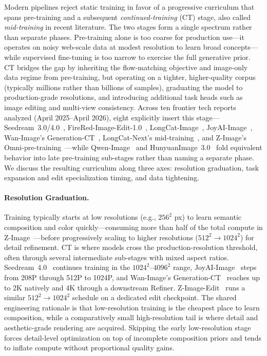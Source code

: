 {Modern pipelines reject static training in favor of a progressive curriculum that spans pre-training and a subsequent \emph{continued-training} (CT) stage, also called \emph{mid-training} in recent literature. The two stages form a single spectrum rather than separate phases. Pre-training alone is too coarse for production use---it operates on noisy web-scale data at modest resolution to learn broad concepts---while supervised fine-tuning is too narrow to exercise the full generative prior. CT bridges the gap by inheriting the flow-matching objective and image-only data regime from pre-training, but operating on a tighter, higher-quality corpus (typically millions rather than billions of samples), graduating the model to production-grade resolutions, and introducing additional task heads such as image editing and multi-view consistency. Across ten frontier tech reports analyzed (April 2025--April 2026), eight explicitly insert this stage---Seedream~3.0/4.0~\citep{gao2025seedream,seedream2025seedream}, FireRed-Image-Edit-1.0~\citep{team2026firered}, LongCat-Image~\citep{team2025longcat}, JoyAI-Image~\citep{jdjoyaiimage}, Wan-Image's Generation-CT~\citep{mao2026wan}, LongCat-Next's mid-training~\citep{team2026longcat}, and Z-Image's Omni-pre-training~\citep{cai2025z}---while Qwen-Image~\citep{wu2025qwen} and HunyuanImage~3.0~\citep{cao2025hunyuanimage} fold equivalent behavior into late pre-training sub-stages rather than naming a separate phase. We discuss the resulting curriculum along three axes: resolution graduation, task expansion and edit specialization timing, and data tightening.}

\paragraph{Resolution Graduation.}
{Training typically starts at low resolutions (e.g., $256^2$ px) to learn semantic composition and color quickly---consuming more than half of the total compute in Z-Image~\citep{cai2025z}---before progressively scaling to higher resolutions ($512^2 \rightarrow 1024^2$) for detail refinement. CT is where models cross the production-resolution threshold, often through several intermediate sub-stages with mixed aspect ratios. Seedream~4.0~\citep{seedream2025seedream} continues training in the $1024^2$--$4096^2$ range, JoyAI-Image~\citep{jdjoyaiimage} steps from 208P through 512P to 1024P, and Wan-Image's Generation-CT~\citep{mao2026wan} reaches up to 2K natively and 4K through a downstream Refiner. Z-Image-Edit~\citep{cai2025z} runs a similar $512^2 \rightarrow 1024^2$ schedule on a dedicated edit checkpoint. The shared engineering rationale is that low-resolution training is the cheapest place to learn composition, while a comparatively small high-resolution tail is where detail and aesthetic-grade rendering are acquired. Skipping the early low-resolution stage forces detail-level optimization on top of incomplete composition priors and tends to inflate compute without proportional quality gains.}

